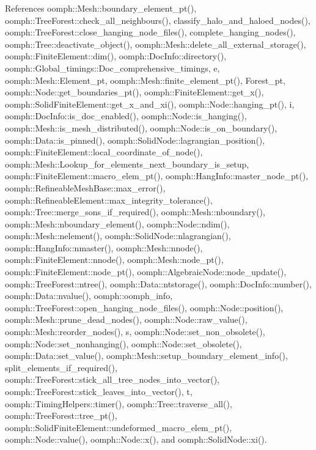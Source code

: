 References oomph\+::\+Mesh\+::boundary\+\_\+element\+\_\+pt(), oomph\+::\+Tree\+Forest\+::check\+\_\+all\+\_\+neighbours(), classify\+\_\+halo\+\_\+and\+\_\+haloed\+\_\+nodes(), oomph\+::\+Tree\+Forest\+::close\+\_\+hanging\+\_\+node\+\_\+files(), complete\+\_\+hanging\+\_\+nodes(), oomph\+::\+Tree\+::deactivate\+\_\+object(), oomph\+::\+Mesh\+::delete\+\_\+all\+\_\+external\+\_\+storage(), oomph\+::\+Finite\+Element\+::dim(), oomph\+::\+Doc\+Info\+::directory(), oomph\+::\+Global\+\_\+timings\+::\+Doc\+\_\+comprehensive\+\_\+timings, e, oomph\+::\+Mesh\+::\+Element\+\_\+pt, oomph\+::\+Mesh\+::finite\+\_\+element\+\_\+pt(), Forest\+\_\+pt, oomph\+::\+Node\+::get\+\_\+boundaries\+\_\+pt(), oomph\+::\+Finite\+Element\+::get\+\_\+x(), oomph\+::\+Solid\+Finite\+Element\+::get\+\_\+x\+\_\+and\+\_\+xi(), oomph\+::\+Node\+::hanging\+\_\+pt(), i, oomph\+::\+Doc\+Info\+::is\+\_\+doc\+\_\+enabled(), oomph\+::\+Node\+::is\+\_\+hanging(), oomph\+::\+Mesh\+::is\+\_\+mesh\+\_\+distributed(), oomph\+::\+Node\+::is\+\_\+on\+\_\+boundary(), oomph\+::\+Data\+::is\+\_\+pinned(), oomph\+::\+Solid\+Node\+::lagrangian\+\_\+position(), oomph\+::\+Finite\+Element\+::local\+\_\+coordinate\+\_\+of\+\_\+node(), oomph\+::\+Mesh\+::\+Lookup\+\_\+for\+\_\+elements\+\_\+next\+\_\+boundary\+\_\+is\+\_\+setup, oomph\+::\+Finite\+Element\+::macro\+\_\+elem\+\_\+pt(), oomph\+::\+Hang\+Info\+::master\+\_\+node\+\_\+pt(), oomph\+::\+Refineable\+Mesh\+Base\+::max\+\_\+error(), oomph\+::\+Refineable\+Element\+::max\+\_\+integrity\+\_\+tolerance(), oomph\+::\+Tree\+::merge\+\_\+sons\+\_\+if\+\_\+required(), oomph\+::\+Mesh\+::nboundary(), oomph\+::\+Mesh\+::nboundary\+\_\+element(), oomph\+::\+Node\+::ndim(), oomph\+::\+Mesh\+::nelement(), oomph\+::\+Solid\+Node\+::nlagrangian(), oomph\+::\+Hang\+Info\+::nmaster(), oomph\+::\+Mesh\+::nnode(), oomph\+::\+Finite\+Element\+::nnode(), oomph\+::\+Mesh\+::node\+\_\+pt(), oomph\+::\+Finite\+Element\+::node\+\_\+pt(), oomph\+::\+Algebraic\+Node\+::node\+\_\+update(), oomph\+::\+Tree\+Forest\+::ntree(), oomph\+::\+Data\+::ntstorage(), oomph\+::\+Doc\+Info\+::number(), oomph\+::\+Data\+::nvalue(), oomph\+::oomph\+\_\+info, oomph\+::\+Tree\+Forest\+::open\+\_\+hanging\+\_\+node\+\_\+files(), oomph\+::\+Node\+::position(), oomph\+::\+Mesh\+::prune\+\_\+dead\+\_\+nodes(), oomph\+::\+Node\+::raw\+\_\+value(), oomph\+::\+Mesh\+::reorder\+\_\+nodes(), s, oomph\+::\+Node\+::set\+\_\+non\+\_\+obsolete(), oomph\+::\+Node\+::set\+\_\+nonhanging(), oomph\+::\+Node\+::set\+\_\+obsolete(), oomph\+::\+Data\+::set\+\_\+value(), oomph\+::\+Mesh\+::setup\+\_\+boundary\+\_\+element\+\_\+info(), split\+\_\+elements\+\_\+if\+\_\+required(), oomph\+::\+Tree\+Forest\+::stick\+\_\+all\+\_\+tree\+\_\+nodes\+\_\+into\+\_\+vector(), oomph\+::\+Tree\+Forest\+::stick\+\_\+leaves\+\_\+into\+\_\+vector(), t, oomph\+::\+Timing\+Helpers\+::timer(), oomph\+::\+Tree\+::traverse\+\_\+all(), oomph\+::\+Tree\+Forest\+::tree\+\_\+pt(), oomph\+::\+Solid\+Finite\+Element\+::undeformed\+\_\+macro\+\_\+elem\+\_\+pt(), oomph\+::\+Node\+::value(), oomph\+::\+Node\+::x(), and oomph\+::\+Solid\+Node\+::xi().

